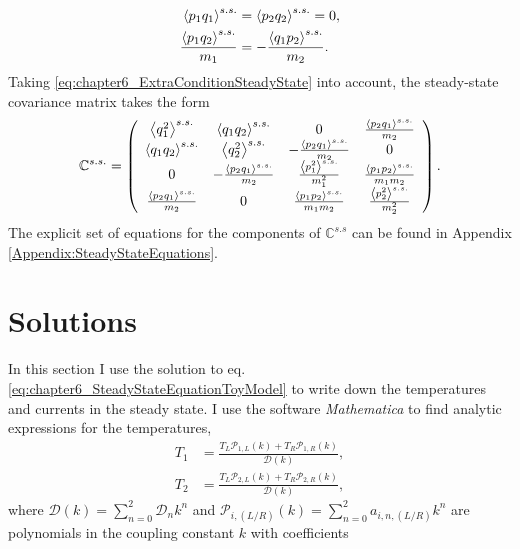 %
\begin{align}
  \expval{ p_1 q_1}^{s.s.} &= \expval{ p_2 q_2}^{s.s.} = 0,\nonumber\\
  \frac{\expval{ p_1 q_2}^{s.s.}}{m_1}&=-\frac{\expval{ q_1 p_2}^{s.s.}}{m_2}.
  \label{eq:chapter6_ExtraConditionSteadyState}
\end{align}
%
Taking \eqref{eq:chapter6_ExtraConditionSteadyState} into account, the steady-state covariance matrix takes the form
%
\begin{equation}
  \begin{split}
    \mathbb{C}^{s.s.} =
    \left(
    \begin{array}{cccc}
      \expval{ q_1^2}^{s.s.}  & \expval{ q_1 q_2}^{s.s.}  & 0 & \frac{\expval{ p_2 q_1}^{s.s.} }{m_2} \\
      \expval{ q_1 q_2}^{s.s.}  & \expval{ q_2^2}^{s.s.}  & -\frac{\expval{ p_2 q_1}^{s.s.} }{m_2} & 0 \\
      0 & -\frac{\expval{ p_2 q_1}^{s.s.} }{m_2} & \frac{\expval{ p_1^2}^{s.s.} }{m_1^2} & \frac{\expval{ p_1 p_2}^{s.s.} }{m_1 m_2} \\
      \frac{\expval{ p_2 q_1}^{s.s.} }{m_2} & 0 & \frac{\expval{ p_1 p_2}^{s.s.} }{m_1 m_2} & \frac{\expval{ p_2^2}^{s.s.} }{m_2^2} \\
      \end{array}
      \right)
    \end{split}
    \label{eq:chapter6_steadyStateCovarianceMatrix}\,.
\end{equation}
%
The explicit set of equations for the components of $\mathbb{C}^{s.s}$ can be found in Appendix \ref{Appendix:SteadyStateEquations}.
%
%
%
%
%
\section{Solutions\label{sec:solutions}}
%
%
%
%

%
In this section I use the solution to eq. \eqref{eq:chapter6_SteadyStateEquationToyModel} to write down the temperatures and currents in the steady state. I use the software {\it Mathematica} to find analytic expressions for the temperatures,
%
\begin{align}
  T_1 &= \frac{T_L \mathcal{P}_{1,L}(k) + T_R \mathcal{P}_{1,R}(k)}{\mathcal{D}(k)},\nonumber
  \\
  T_2 &= \frac{T_L \mathcal{P}_{2,L}(k) + T_R \mathcal{P}_{2,R}(k)}{\mathcal{D}(k)},
  \label{eq:chapter6_ModelBTemperatures}
\end{align}
%
where $\mathcal{D}(k) =  \sum\limits_{n=0}^2 \mathcal{D}_n k^n$ and $\mathcal{P}_{i,(L/R)}(k) = \sum\limits_{n=0}^2 a_{i,n,(L/R)} k^n$ are polynomials in the coupling constant $k$ with coefficients
%

